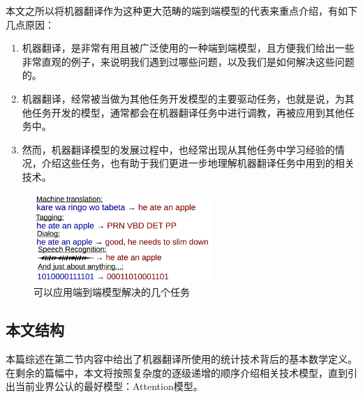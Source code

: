 \documentclass[10pt,a4paper]{ctexart}
\begin{document}
本文之所以将机器翻译作为这种更大范畴的端到端模型的代表来重点介绍，有如下几点原因：
\begin{enumerate}
\item 机器翻译，是非常有用且被广泛使用的一种端到端模型，且方便我们给出一些非常直观的例子，来说明我们遇到过哪些问题，以及我们是如何解决这些问题的。
\item 机器翻译，经常被当做为其他任务开发模型的主要驱动任务，也就是说，为其他任务开发的模型，通常都会在机器翻译任务中进行调教，再被应用到其他任务中。
\item 然而，机器翻译模型的发展过程中，也经常出现从其他任务中学习经验的情况，介绍这些任务，也有助于我们更进一步地理解机器翻译任务中用到的相关技术。
\end{enumerate}

\begin{figure}[H]
\centering
\includegraphics[width=0.6\textwidth]{fig1.png}
\caption{可以应用端到端模型解决的几个任务}
\label{fig:1}
\end{figure}


\subsection{本文结构}
本篇综述在第二节内容中给出了机器翻译所使用的统计技术背后的基本数学定义。
在剩余的篇幅中，本文将按照复杂度的逐级递增的顺序介绍相关技术模型，直到引出当前业界公认的最好模型：Attention模型。
\end{document}
